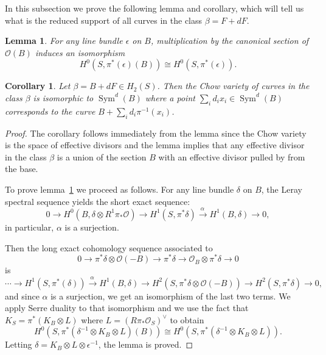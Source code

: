 \documentclass[12pt]{amsart}
\newtheorem{corollary}[theorem]{Corollary}
\newtheorem{lemma}[theorem]{Lemma}
\theoremstyle{definition}
\theoremstyle{property}
\renewcommand\O{\mathcal O}
\newcommand{\rt}[1]{\stackrel{#1\,}{\rightarrow}}
\newcommand{\Rt}[1]{\stackrel{#1\,}{\longrightarrow}}
\renewcommand\_{^{}_}
\newcommand\Sym{\operatorname{Sym}}
\begin{document}
In this subsection we prove the following lemma and corollary, which will tell us what is the reduced support of all curves in the class $\beta =F+dF$.

\begin{lemma}\label{lem: H0 (pi* (D) (B))=H0 (pi* (D))}
For any line bundle $\epsilon $ on $B$, multiplication by the
canonical section of $\O (B)$ induces an isomorphism
\[
H^{0} (S,\pi ^{*} (\epsilon ) (B)) \cong H^{0} (S,\pi ^{*} (\epsilon )).
\]
\end{lemma}

\begin{corollary}\label{cor: chow(beta) = sym (B)}
Let $\beta = B+dF \in H_{2} (S)$. Then the Chow variety of curves in
the class $\beta $ is isomorphic to $\Sym ^{d} (B)$ where a point
$\sum _{i}d_{i} x_{i}\in \Sym ^{d} (B)$ corresponds to the curve
$B+\sum _{i}d_{i}\pi ^{-1} (x_{i}) $.
\end{corollary}

\begin{proof}
The corollary follows immediately from the lemma since the Chow
variety is the space of effective divisors and the lemma implies that
any effective divisor in the class $\beta $ is a union of the section
$B$ with an effective divisor pulled by from the base.

To prove lemma~\ref{lem: H0 (pi* (D) (B))=H0 (pi* (D))} we proceed as
follows. For any line bundle $\delta $ on $B$, the Leray spectral
sequence yields the short exact sequence:
\[
0\to H^{0} (B,\delta \otimes R^{1}\pi _{*}\O )\to H^{1} (S,\pi ^{*}\delta )\Rt{\alpha } H^{1} (B,\delta )\to 0,
\]
in particular, $\alpha $ is a surjection.

Then the long exact cohomology sequence associated to 
\[
0\to \pi ^{*}\delta \otimes \O (-B)\to \pi ^{*}\delta \to \O _{B}\otimes \pi ^{*}\delta \to 0
\]
is
\[
\dotsb \to H^{1} (S,\pi ^{*} (\delta ))\rt{\alpha }H^{1} (B,\delta )\to H^{2} (S,\pi ^{*}\delta \otimes \O (-B))\to H^{2} (S,\pi ^{*}\delta )\to 0,
\]
and since $\alpha $ is a surjection, we get an isomorphism of the last
two terms. We apply Serre duality to that isomorphism and we use the
fact that $K_{S} = \pi ^{*} (K_{B}\otimes L)$ where $L = \left(R\pi
_{*}\O _{S} \right)^{\vee }$ \cite[prop?]{Fr-Mo} to obtain
\[
H^{0} (S,\pi ^{*} (\delta ^{-1}\otimes K_{B}\otimes L) (B)) \cong H^{0}(S,\pi ^{*} (\delta ^{-1}\otimes K_{B}\otimes L)).
\]
Letting $\delta =K_{B}\otimes L\otimes \epsilon ^{-1}$, the lemma is
proved.
\end{proof}
\end{document}
